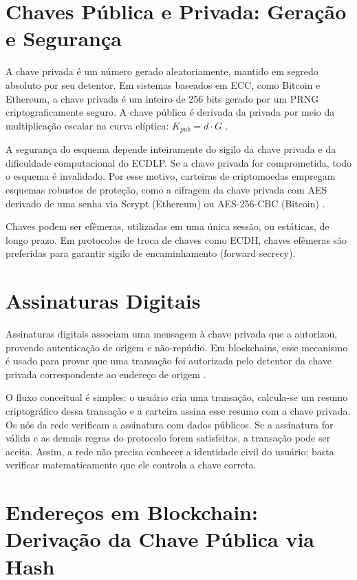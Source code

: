 \documentclass[12pt,a4paper]{report}
\begin{document}
\section{Chaves Pública e Privada: Geração e Segurança}

A chave privada é um número gerado aleatoriamente, mantido em segredo absoluto por seu detentor. Em sistemas baseados em ECC, como Bitcoin e Ethereum, a chave privada é um inteiro de 256 bits gerado por um PRNG criptograficamente seguro. A chave pública é derivada da privada por meio da multiplicação escalar na curva elíptica: $K_{pub} = d \cdot G$ \cite{Bashir2023}.

A segurança do esquema depende inteiramente do sigilo da chave privada e da dificuldade computacional do ECDLP. Se a chave privada for comprometida, todo o esquema é invalidado. Por esse motivo, carteiras de criptomoedas empregam esquemas robustos de proteção, como a cifragem da chave privada com AES derivado de uma senha via Scrypt (Ethereum) ou AES-256-CBC (Bitcoin) \cite{Bashir2023}.

Chaves podem ser efêmeras, utilizadas em uma única sessão, ou estáticas, de longo prazo. Em protocolos de troca de chaves como ECDH, chaves efêmeras são preferidas para garantir sigilo de encaminhamento (forward secrecy).

\section{Assinaturas Digitais}

Assinaturas digitais associam uma mensagem à chave privada que a autorizou, provendo autenticação de origem e não-repúdio. Em blockchains, esse mecanismo é usado para provar que uma transação foi autorizada pelo detentor da chave privada correspondente ao endereço de origem \cite{Bashir2023}.

O fluxo conceitual é simples: o usuário cria uma transação, calcula-se um resumo criptográfico dessa transação e a carteira assina esse resumo com a chave privada. Os nós da rede verificam a assinatura com dados públicos. Se a assinatura for válida e as demais regras do protocolo forem satisfeitas, a transação pode ser aceita. Assim, a rede não precisa conhecer a identidade civil do usuário; basta verificar matematicamente que ele controla a chave correta.

\section[Endereços em Blockchain]{Endereços em Blockchain: Derivação da Chave Pública via Hash}
\end{document}
